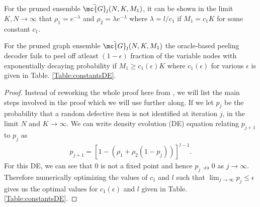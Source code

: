 \documentclass[conference,twocolumn]{IEEEtran}
\begin{document}
\begin{lemma}
For the pruned ensemble $\tilde{\mc{G}}_l(N,K,M_1)$, it can be shown in the limit $K,N\rightarrow\infty$ that $\rho_{1}=e^{-\lambda}$ and $\rho_{2}=\lambda e^{-\lambda}$ where $\lambda=l/c_1$ if $M_1=c_1K$ for some constant $c_1$. 
\end{lemma}

\begin{lemma}
\label{Lem:PeelingAnalysisLeftRegular}
For the pruned graph ensemble $\tilde{\mc{G}}_l(N, K,M_1)$ the oracle-based peeling decoder fails to peel off atleast $(1-\epsilon)$ fraction of the variable nodes with exponentially decaying probability if $M_1\geq c_1(\epsilon)K$ where $c_1(\epsilon)$ for various $\epsilon$ is given in Table. \ref{Table:constantsDE}.
\end{lemma}
\begin{proof}
Instead of reworking the whole proof here from \cite{lee2015saffron}, we will list the main steps involved in the proof which we will use further along. If we let $p_j$ be the probability that a random defective item is not identified at iteration $j$, in the limit $N \text{ and } K\rightarrow \infty$. We can write density evolution (DE) equation relating $p_{j+1}$ to $p_{j}$ as 
\begin{align*}
p_{j+1}=\left[1-(\rho_1+\rho_2(1-p_j))\right]^{l-1}.
\end{align*}
For this DE, we can see that $0$ is not a fixed point and hence $p_j\nrightarrow 0$ as $j\rightarrow\infty$. Therefore numerically optimizing the values of $c_1$ and $l$ such that $\lim_{j\rightarrow\infty}p_j\leq \epsilon$ gives us the optimal values for $c_1(\epsilon)$ and $l$ given in Table. \ref{Table:constantsDE}.
\end{proof}
\end{document}
